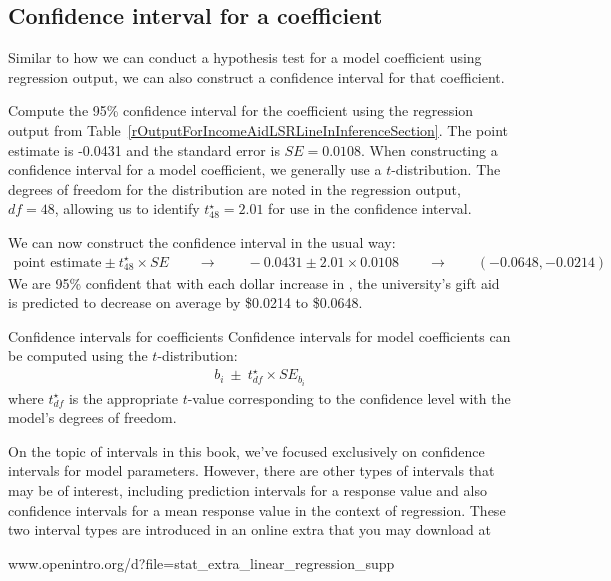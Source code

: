 \newpage

\subsection{Confidence interval for a coefficient}

%

Similar to how we can conduct a hypothesis test for
a model coefficient using regression output, we can also
construct a confidence interval for that coefficient.

\begin{examplewrap}
\begin{nexample}{
    Compute the 95\% confidence interval for the
     coefficient using the
    regression output from
    Table~\ref{rOutputForIncomeAidLSRLineInInferenceSection}.}
  The point estimate is -0.0431 and the standard error is
  $SE = 0.0108$.
  When constructing a confidence interval for a model
  coefficient, we generally use a $t$-distribution.
  The degrees of freedom for the distribution are noted in
  the regression output, $df = 48$, allowing us to identify
  $t_{48}^{\star} = 2.01$ for use in the confidence interval.

  We can now construct the confidence interval in the usual way:
  \begin{align*}
  \text{point estimate} \pm t_{48}^{\star} \times SE
    \qquad\to\qquad -0.0431 \pm 2.01 \times 0.0108
    \qquad\to\qquad (-0.0648, -0.0214)
  \end{align*}
  We are 95\% confident that with each dollar increase in
  , the university's gift aid is
  predicted to decrease on average by \$0.0214 to \$0.0648.
\end{nexample}
\end{examplewrap}

\begin{onebox}{Confidence intervals for coefficients}
  Confidence intervals for model coefficients can be computed
  using the $t$-distribution:
  \begin{align*}
  b_i \ \pm\ t_{df}^{\star} \times SE_{b_{i}}
  \end{align*}
  where $t_{df}^{\star}$ is the appropriate $t$-value
  corresponding to the confidence level with the
  model's degrees of freedom.
\end{onebox}

On the topic of intervals in this book, we've focused exclusively
on confidence intervals for model parameters.
However, there are other types of intervals that may be
of interest, including
prediction intervals
for a response value
and also
confidence intervals for a
mean response value
in the context of regression.
These two interval types are introduced in an online extra
that you may download at
\begin{center}
    {www.openintro.org/d?file=stat\_extra\_linear\_regression\_supp}
\end{center}

%


{}

